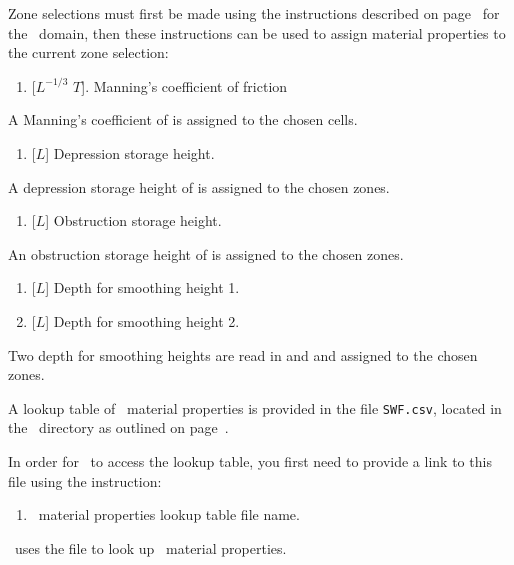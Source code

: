 Zone selections must first be made using the instructions described on page~\pageref{page:zoneSelect} for the \gwf\ domain, then these instructions can be used to assign material properties to the current zone selection:

    {
        \squish
        \begin{enumerate}
        \item {} [$L^{-1/3}$  $T$].  Manning's coefficient of friction
        \end{enumerate}
          A Manning's coefficient of  is assigned to the chosen cells.
    }

    {
        \squish
        \begin{enumerate}
        \item {} [$L$]  Depression storage height.
        \end{enumerate}
          A depression storage height of  is assigned to the chosen zones.
    }

    {
        \squish
        \begin{enumerate}
        \item {} [$L$]  Obstruction storage height.
        \end{enumerate}
          An obstruction storage height of  is assigned to the chosen zones.
    }

    {
        \squish
        \begin{enumerate}
        \item {} [$L$]  Depth for smoothing height 1.
        \item {} [$L$]  Depth for smoothing height 2.
        \end{enumerate}
          Two depth for smoothing heights are read in  and  and assigned to the chosen zones.
    }

A lookup table of \swf\ material properties  is provided in the file \texttt{SWF.csv}, located in the \bin\ directory as outlined on page~\pageref{page:userbin}.

In order for \mut\ to access the lookup table, you first need to provide a link to this file using the instruction:

    {
        \squish
        \begin{enumerate}
        \item {}  \swf\ material properties lookup table file name.
        \end{enumerate}
          \mut\ uses the file  to look up \swf\ material properties.
    }

